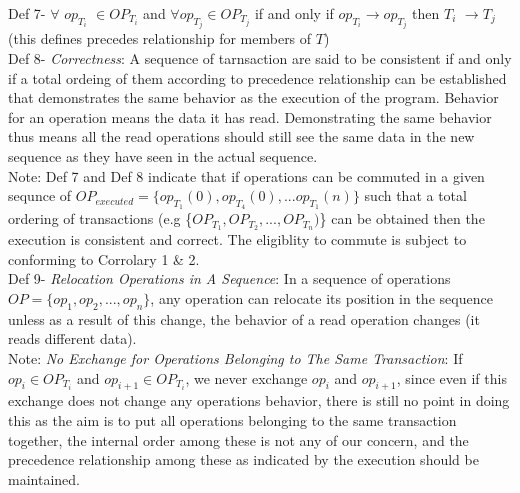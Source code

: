 \documentclass[a4paper, 11pt]{article}
\begin{document}
Def 7- $\forall$ $op_{T_i}$ $\in OP_{T_i}$ and $\forall op_{T_j}\in OP_{T_j}$ if and only if $op_{T_i} \rightarrow op_{T_j}$ then $T_i$ $\rightarrow T_j$ \hspace{8mm} (this defines precedes relationship for members of $T$) \\

Def 8- \emph{Correctness}: A sequence of tarnsaction are said to be consistent if and only if a total ordeing of them according to precedence relationship can be established that demonstrates the same behavior as the execution of the program. Behavior for an operation means the data it has read. Demonstrating the same behavior thus means all the read operations should still see the same data in the new sequence as they have seen in the actual sequence.\\

Note: Def 7 and Def 8 indicate that if operations can be commuted in a given sequnce of $OP_{executed} = \{op_{T_1}(0), op_{T_4}(0), ... op_{T_1}(n)\}$ such that a total ordering of transactions (e.g \{$OP_{T_1}, OP_{T_2}, ..., OP_{T_n}) $\} can be obtained then the execution is consistent and correct. The eligiblity to commute is subject to conforming to Corrolary 1 \& 2.\\

Def 9- \emph{Relocation Operations in A Sequence}: In a sequence of operations $OP = \{op_1, op_2, ...,op_n\}$, any operation can relocate its position in the sequence unless as a result of this change, the behavior of a read operation changes (it reads different data).\\

Note: \emph{No Exchange for Operations Belonging to The Same Transaction}: If $op_i \in OP_{T_i}$ and $op_{i+1} \in OP_{T_i}$, we never exchange $op_i$ and $op_{i+1}$, since even if this exchange does not change any operations behavior, there is still no point in doing this as the aim is to put all operations belonging to the same transaction together, the internal order among these is not any of our concern, and the precedence relationship among these as indicated by the execution should be maintained.\\ 



\end{document}
